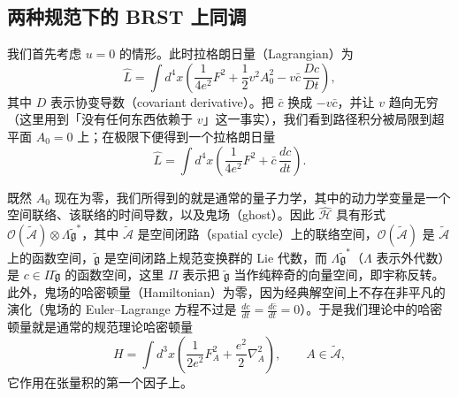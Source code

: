 \subsection{两种规范下的 BRST 上同调}

我们首先考虑 $u=0$ 的情形。此时拉格朗日量（Lagrangian）为
\[
\widehat L=\int d^4x\left(\frac{1}{4e^2}F^2+\frac{1}{2}v^2A_0^2-v\bar c\,\frac{Dc}{Dt}\right),
\]
其中 $D$ 表示协变导数（covariant derivative）。把 $\bar c$ 换成 $-v\bar c$，并让 $v$ 趋向无穷（这里用到「没有任何东西依赖于 $v$」这一事实），我们看到路径积分被局限到超平面 $A_0=0$ 上；在极限下便得到一个拉格朗日量
\begin{equation}
  \tag{3.8}
  \label{eq:3-8}
  \widehat L=\int d^4x\left(\frac{1}{4e^2}F^2+\bar c\,\frac{dc}{dt}\right).
\end{equation}


既然 $A_0$ 现在为零，我们所得到的就是通常的量子力学，其中的动力学变量是一个空间联络、该联络的时间导数，以及鬼场（ghost）。因此 $\widehat{\mathcal H}$ 具有形式 $\mathcal O(\widetilde{\mathcal A})\otimes\Lambda\tilde{\mathfrak g}^{*}$，其中 $\widetilde{\mathcal A}$ 是空间闭路（spatial cycle）上的联络空间，$\mathcal O(\widetilde{\mathcal A})$ 是 $\widetilde{\mathcal A}$ 上的函数空间，$\tilde{\mathfrak g}$ 是空间闭路上规范变换群的 Lie 代数，而 $\Lambda\tilde{\mathfrak g}^{*}$（$\Lambda$ 表示外代数）是 $c\in\Pi\tilde{\mathfrak g}$ 的函数空间，这里 $\Pi$ 表示把 $\tilde{\mathfrak g}$ 当作纯粹奇的向量空间，即宇称反转。此外，鬼场的哈密顿量（Hamiltonian）为零，因为经典解空间上不存在非平凡的演化（鬼场的 Euler–Lagrange 方程不过是 $\frac{dc}{dt}=\frac{d\bar c}{dt}=0$）。于是我们理论中的哈密顿量就是通常的规范理论哈密顿量
\begin{equation}
  \tag{3.9}
  \label{eq:3-9}
  H=\int d^3x\left(\frac{1}{2e^2}F_A^2+\frac{e^2}{2}\nabla_A^2\right),\qquad A\in\widetilde{\mathcal A},
\end{equation}
它作用在张量积的第一个因子上。

